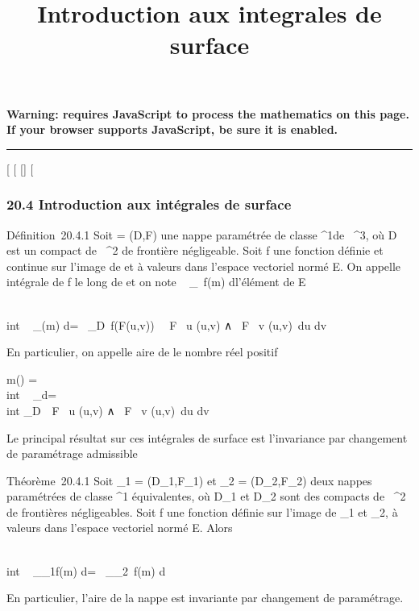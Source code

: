 \documentclass[]{article}
\title{Introduction aux integrales de surface}
\author{}
\date{}
\begin{document}
\maketitle

\textbf{Warning: 
requires JavaScript to process the mathematics on this page.\\ If your
browser supports JavaScript, be sure it is enabled.}

\begin{center}\rule{3in}{0.4pt}\end{center}

[
[
[]
[

\subsubsection{20.4 Introduction aux intégrales de surface}

Définition~20.4.1 Soit \Sigma = (D,F) une nappe paramétrée de classe
^1de ~^3, où D est un compact de ~^2
de frontière négligeable. Soit f une fonction définie et continue sur
l'image de \Sigma et à valeurs dans l'espace vectoriel normé E. On appelle
intégrale de f le long de \Sigma et on note \int ~
\int  _\Sigma~f(m) d\sigma l'élément de E

\int  \\int ~
_\Sigmaf(m) d\sigma =\int ~
\int  _D~f(F(u,v))
\ \partial~F \over \partial~u (u,v) ∧ \partial~F
\over \partial~v (u,v)\ du dv

En particulier, on appelle aire de \Sigma le nombre réel positif

m(\Sigma) =\int  \\int ~
_\Sigma d\sigma =\int ~ \\int
 _D\ \partial~F \over \partial~u
(u,v) ∧ \partial~F \over \partial~v (u,v)\
du dv

Le principal résultat sur ces intégrales de surface est l'invariance par
changement de paramétrage admissible

Théorème~20.4.1 Soit \Sigma_1 = (D_1,F_1) et
\Sigma_2 = (D_2,F_2) deux nappes paramétrées de
classe ^1 équivalentes, où D_1 et D_2 sont
des compacts de ~^2 de frontières négligeables. Soit f une
fonction définie sur l'image de \Sigma_1 et \Sigma_2, à valeurs
dans l'espace vectoriel normé E. Alors

\int  \\int ~
_\Sigma_1f(m) d\sigma =\int ~
\int  _\Sigma_2~f(m) d\sigma

En particulier, l'aire de la nappe est invariante par changement de
paramétrage.
\end{document}
